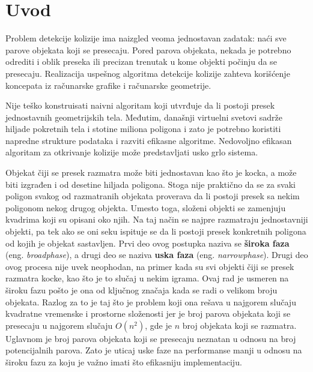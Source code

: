 \documentclass[12pt,oneside]{memoir}
\begin{document}
\frontmatter

\naslovna
\komisija

\begingroup
\vspace*{-5\baselineskip}
\tableofcontents
\endgroup

\mainmatter

\chapter{Uvod}
\label{sec:uvod}

Problem detekcije kolizije ima naizgled veoma jednostavan zadatak: naći sve parove objekata
koji se presecaju. Pored parova objekata, nekada je potrebno odrediti i oblik preseka
ili precizan trenutak u kome objekti počinju da se presecaju. 
Realizacija uspešnog algoritma detekcije kolizije zahteva korišćenje 
koncepata iz računarske grafike i računarske geometrije.

Nije teško konstruisati naivni algoritam koji utvrđuje da li postoji presek jednostavnih geometrijskih tela.
Međutim, današnji virtuelni svetovi sadrže hiljade pokretnih tela i stotine miliona poligona i 
zato je potrebno koristiti napredne strukture podataka i razviti efikasne algoritme. 
Nedovoljno efikasan algoritam za otkrivanje kolizije može predstavljati usko grlo sistema.

Objekat čiji se presek razmatra može biti jednostavan kao što je kocka, a može biti izgrađen i od desetine hiljada poligona.
Stoga nije praktično da se za svaki poligon svakog od razmatranih objekata
proverava da li postoji presek sa nekim poligonom nekog drugog objekta.
Umesto toga, složeni objekti se zamenjuju kvadrima koji su opisani oko njih.
Na taj način se najpre razmatraju jednostavniji objekti, pa tek ako se oni seku ispituje se da li postoji presek konkretnih poligona od kojih je objekat sastavljen.
%
Prvi deo ovog postupka naziva se \textbf{široka faza} (eng. {\em broadphase}), a drugi deo se naziva \textbf{uska faza} (eng. {\em narrowphase}).
Drugi deo ovog procesa nije uvek neophodan, na primer kada su svi objekti čiji se presek razmatra kocke, kao što je to slučaj u nekim igrama.
Ovaj rad je usmeren na široku fazu pošto je ona od ključnog značaja kada se radi o velikom broju objekata.
Razlog za to je taj što je problem koji ona rešava u najgorem slučaju kvadratne vremenske i prostorne složenosti
jer je broj parova objekata koji se presecaju u najgorem slučaju $O(n^2)$, 
gde je $n$ broj objekata koji se razmatra.
Uglavnom je broj parova objekata koji se presecaju neznatan u odnosu na broj potencijalnih parova. 
Zato je uticaj uske faze na performanse manji u odnosu na široku fazu za koju je važno imati što efikasniju implementaciju.
\end{document}
